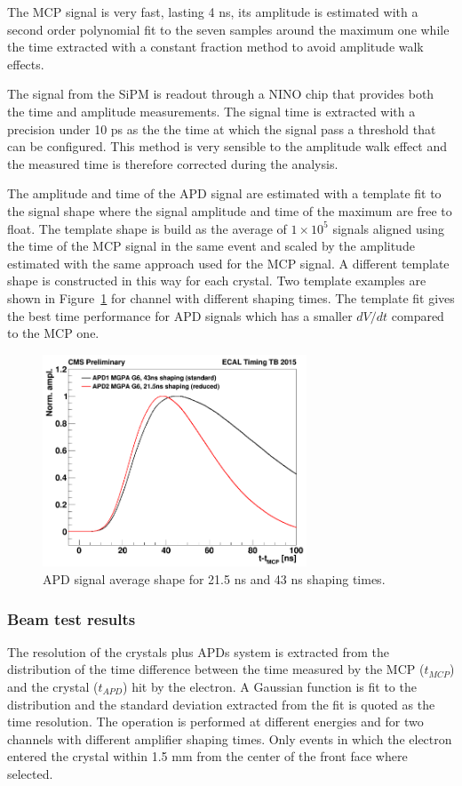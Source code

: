 The MCP signal is very fast, lasting 4 ns, its amplitude is estimated with a second order polynomial fit to the seven samples
around the maximum one while the time extracted with a constant fraction method to avoid amplitude walk effects.

The signal from the SiPM is readout through a NINO chip that provides both the time and amplitude measurements.
The signal time is extracted with a precision under 10 ps as the the time at which the signal pass a threshold that
can be configured. This method is very sensible to the amplitude walk effect and the measured time is therefore
corrected during the analysis.

The amplitude and time of the APD signal are estimated with a template fit to the signal shape where the signal
amplitude and time of the maximum are free to float.
The template shape is build as the average of $1\times 10^5$ signals aligned using the time of the MCP signal
in the same event and scaled by the amplitude estimated with the same approach used for the MCP signal.
A different template shape is constructed in this way
for each crystal. Two template examples are shown in Figure~\ref{fig:apd_templates} for channel with different  
shaping times. The template fit gives the best time performance for APD signals which has a smaller $dV/dt$ compared
to the MCP one.

\begin{figure}[h!]
  \centering
  \includegraphics[width = 0.7\textwidth]{figures/upgrade/wf_shaping_times.png}
  \caption{APD signal average shape for 21.5 ns and 43 ns shaping times.}
  \label{fig:apd_templates}
\end{figure}

\subsubsection{Beam test results}
\label{sec:tb_2015_results}
The resolution of the \PbWO crystals plus APDs system is extracted from 
the distribution of the time difference between the time measured by the MCP ($t_{MCP}$) and the crystal ($t_{APD}$)
hit by the electron.
A Gaussian function is fit to the distribution and the standard deviation extracted from the fit is quoted as
the time resolution. The operation is performed at different energies and for two channels with different
amplifier shaping times. Only events in which the electron entered the crystal within 1.5 mm from the center of the
front face where selected. 

